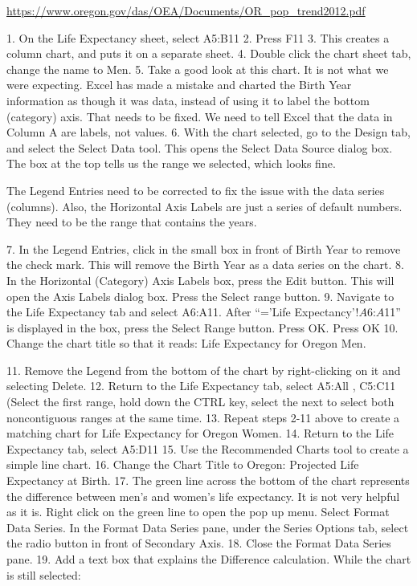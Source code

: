 \url{https://www.oregon.gov/das/OEA/Documents/OR_pop_trend2012.pdf}

1. On the Life Expectancy sheet, select A5:B11
2. Press F11
3. This creates a column chart, and puts it on a separate sheet.
4. Double click the chart sheet tab, change the name to Men.
5. Take a good look at this chart. It is not what we were expecting. Excel has made a mistake and
charted the Birth Year information as though it was data, instead of using it to label the bottom
(category) axis. That needs to be fixed. We need to tell Excel that the data in Column A are labels,
not values.
6. With the chart selected, go to the Design tab, and select the Select Data tool.
This opens the Select Data Source dialog box. The box at the top tells us the range we selected,
which looks fine.

The Legend Entries need to be corrected to fix the issue with the data series (columns). Also, the
Horizontal Axis Labels are just a series of default numbers. They need to be the range that contains
the years.

7. In the Legend Entries, click in the small box in front of Birth Year to remove the check mark.
This will remove the Birth Year as a data series on the chart.
8. In the Horizontal (Category) Axis Labels box, press the Edit button. This will open the Axis
Labels dialog box. Press the Select range button.
9. Navigate to the Life Expectancy tab and select A6:A11. After “=’Life Expectancy’!$A$6:$A$11”
is displayed in the box, press the Select Range button. Press OK.
Press OK
10. Change the chart title so that it reads: Life Expectancy for Oregon Men.


11. Remove the Legend from the bottom of the chart by right-clicking on it and selecting Delete.
12. Return to the Life Expectancy tab, select A5:All , C5:C11 (Select the first range, hold down the
CTRL key, select the next to select both noncontiguous ranges at the same time.
13. Repeat steps 2-11 above to create a matching chart for Life Expectancy for Oregon Women.
14. Return to the Life Expectancy tab, select A5:D11
15. Use the Recommended Charts tool to create a simple line chart.
16. Change the Chart Title to Oregon: Projected Life Expectancy at Birth.
17. The green line across the bottom of the chart represents the difference between men’s and
women’s life expectancy. It is not very helpful as it is.
Right click on the green line to open the pop up menu. Select Format Data Series. In the
Format Data Series pane, under the Series Options tab, select the radio button in front of
Secondary Axis.
18. Close the Format Data Series pane.
19. Add a text box that explains the Difference calculation. While the chart is still selected:

